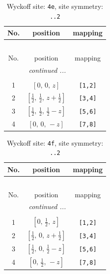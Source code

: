 \documentclass[fleqn,8pt]{jsarticle}
\begin{document}
\begin{longtable}{ccc}
\caption{Wyckoff site: {\tt 4e}, site symmetry: {\tt ..2}}
 \\
 \hline \hline
No. & position & mapping \\ \hline \endfirsthead

\multicolumn{2}{l}{\tablename\ \thetable{}} \\
 \hline \hline
No. & position & mapping \\ \hline \endhead

 \hline \hline
\multicolumn{2}{r}{\footnotesize\it continued ...} \\ \endfoot

 \hline \hline
\multicolumn{2}{r}{} \\ \endlastfoot

1 & $\left[ 0,\, 0,\, z \right]$ & {\tt [1,2]} \\ \hline
2 & $\left[ \frac{1}{2},\, \frac{1}{2},\, z + \frac{1}{2} \right]$ & {\tt [3,4]} \\ \hline
3 & $\left[ \frac{1}{2},\, \frac{1}{2},\, \frac{1}{2} - z \right]$ & {\tt [5,6]} \\ \hline
4 & $\left[ 0,\, 0,\, - z \right]$ & {\tt [7,8]} \\
\end{longtable}
\renewcommand{\arraystretch}{1.2}
\begin{longtable}{ccc}
\caption{Wyckoff site: {\tt 4f}, site symmetry: {\tt ..2}}
 \\
 \hline \hline
No. & position & mapping \\ \hline \endfirsthead

\multicolumn{2}{l}{\tablename\ \thetable{}} \\
 \hline \hline
No. & position & mapping \\ \hline \endhead

 \hline \hline
\multicolumn{2}{r}{\footnotesize\it continued ...} \\ \endfoot

 \hline \hline
\multicolumn{2}{r}{} \\ \endlastfoot

1 & $\left[ 0,\, \frac{1}{2},\, z \right]$ & {\tt [1,2]} \\ \hline
2 & $\left[ \frac{1}{2},\, 0,\, z + \frac{1}{2} \right]$ & {\tt [3,4]} \\ \hline
3 & $\left[ \frac{1}{2},\, 0,\, \frac{1}{2} - z \right]$ & {\tt [5,6]} \\ \hline
4 & $\left[ 0,\, \frac{1}{2},\, - z \right]$ & {\tt [7,8]} \\
\end{longtable}
\end{document}
